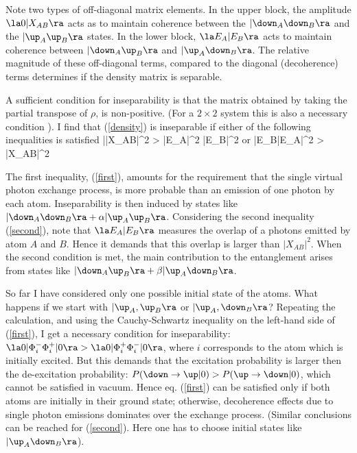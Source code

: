 Note two types of off-diagonal matrix elements.
In the upper block,  the amplitude
$\la 0| X_{AB}\ra$ acts as to maintain coherence between the
$|\down_A\down_B\ra$ and the $|\up_A\up_B\ra$ states.
In the lower block, $\la E_A|E_B\ra$
acts to maintain coherence
between $|\down_A\up_B\ra$ and $|\up_A\down_B\ra$.
The relative magnitude of these off-diagonal terms, compared
to the diagonal (decoherence) terms
determines if the density matrix is separable.

A sufficient condition \cite{peres} for inseparability is
that the matrix obtained by taking the partial
transpose\cite{pt} of $\rho$, is non-positive. (For a $2\times 2$ system
this is also a necessary condition \cite{iff}).
I find  that (\ref{density}) is inseparable
if either of the following inequalities is satisfied
\beq
||X_{AB}\ra|^2 > |E_A|^2 |E_B|^2
\label{first}
\eeq
or
\beq
|\la E_B|E_A\ra|^2 > |X_{AB}|^2
\label{second}
\eeq

The first inequality, (\ref{first}),
amounts for the requirement that the
single virtual photon exchange process,  is more
probable than an emission
of one photon by each atom.
Inseparability is then induced by states like
$|\down_A\down_B\ra + \alpha |\up_A\up_B\ra$.
Considering the second inequality (\ref{second}),
note that $\la E_A|E_B\ra$ measures the overlap
of a photons emitted by atom $A$ and $B$. Hence
it demands that  this overlap is larger than $|X_{AB}|^2$.
When the second condition
is met, the main contribution to the entanglement arises from states like
 $|\down_A\up_B\ra + \beta |\up_A\down_B\ra$.


So far I have considered only one possible
initial state of the atoms.
What happens if we start with
$|\up_A, \up_B\ra$ or $|\up_A, \down_B\ra$?
Repeating the calculation,
and using the
Cauchy-Schwartz inequality on the left-hand side of
(\ref{first}), I get
a necessary condition for inseparability:
$ \la 0|\Phi^-_i\Phi^+_i|0\ra  > \la 0|\Phi^+_i\Phi_i^-|0\ra$,
where $i$ corresponds to the atom which is initially excited.
But this demands that  the excitation probability
is larger then the de-excitation probability:
$
P(\down \to \up|0 ) > P(\up \to \down |0)
$,
which cannot be satisfied in vacuum.
Hence eq. (\ref{first}) can be satisfied only if
both atoms are initially in their ground state;
otherwise, decoherence effects due to single photon emissions
dominates over the exchange process.
(Similar conclusions can be reached for (\ref{second}).
Here one has to choose initial states like
$|\up_A\down_B\ra$).


